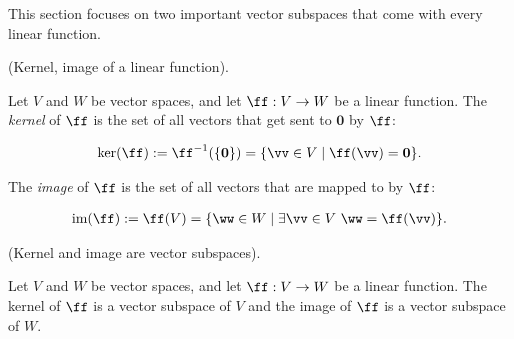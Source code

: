 This section focuses on two important vector subspaces that come with every linear function.

\begin{defn}
    (Kernel, image of a linear function).
    
    Let $V$ and $W$ be vector spaces, and let $\ff:V \rightarrow W$ be a linear function. The \textit{kernel} of $\ff$ is the set of all vectors that get sent to $\mathbf{0}$ by $\ff$:
    
    \begin{align*}
        \ker(\ff) := \ff^{-1}(\{\mathbf{0}\}) = \{ \vv \in V \mid \ff(\vv) = \mathbf{0} \}.
    \end{align*}
    
    The \textit{image} of $\ff$ is the set of all vectors that are mapped to by $\ff$:
    
    \begin{align*}
        \im(\ff) := \ff(V) = \{ \ww \in W \mid \exists \vv \in V \spc \ww = \ff(\vv) \}.
    \end{align*}
\end{defn}

\begin{theorem}
    (Kernel and image are vector subspaces). 
    
    Let $V$ and $W$ be vector spaces, and let $\ff:V \rightarrow W$ be a linear function. The kernel of $\ff$ is a vector subspace of $V$ and the image of $\ff$ is a vector subspace of $W$.
\end{theorem}

